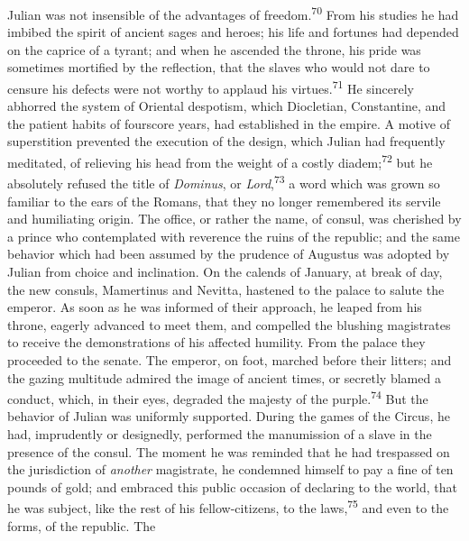 
Julian was not insensible of the advantages of freedom.\textsuperscript{70} From
his studies he had imbibed the spirit of ancient sages and
heroes; his life and fortunes had depended on the caprice of a
tyrant; and when he ascended the throne, his pride was sometimes
mortified by the reflection, that the slaves who would not dare
to censure his defects were not worthy to applaud his virtues.\textsuperscript{71}
He sincerely abhorred the system of Oriental despotism, which
Diocletian, Constantine, and the patient habits of fourscore
years, had established in the empire. A motive of superstition
prevented the execution of the design, which Julian had
frequently meditated, of relieving his head from the weight of a
costly diadem;\textsuperscript{72} but he absolutely refused the title of
\textit{Dominus}, or \textit{Lord},\textsuperscript{73} a word which was grown so familiar to
the ears of the Romans, that they no longer remembered its
servile and humiliating origin. The office, or rather the name,
of consul, was cherished by a prince who contemplated with
reverence the ruins of the republic; and the same behavior which
had been assumed by the prudence of Augustus was adopted by
Julian from choice and inclination. On the calends of January, at
break of day, the new consuls, Mamertinus and Nevitta, hastened
to the palace to salute the emperor. As soon as he was informed
of their approach, he leaped from his throne, eagerly advanced to
meet them, and compelled the blushing magistrates to receive the
demonstrations of his affected humility. From the palace they
proceeded to the senate. The emperor, on foot, marched before
their litters; and the gazing multitude admired the image of
ancient times, or secretly blamed a conduct, which, in their
eyes, degraded the majesty of the purple.\textsuperscript{74} But the behavior of
Julian was uniformly supported. During the games of the Circus,
he had, imprudently or designedly, performed the manumission of a
slave in the presence of the consul. The moment he was reminded
that he had trespassed on the jurisdiction of \textit{another}
magistrate, he condemned himself to pay a fine of ten pounds of
gold; and embraced this public occasion of declaring to the
world, that he was subject, like the rest of his fellow-citizens,
to the laws,\textsuperscript{75} and even to the forms, of the republic. The
